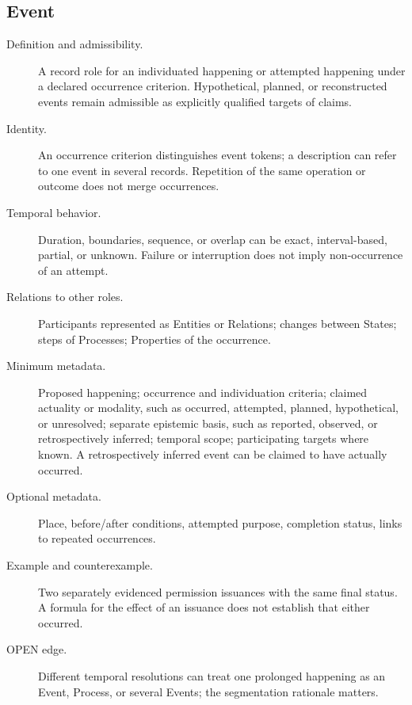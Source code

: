 \documentclass[11pt,a4paper]{article}
\begin{document}
\subsection{Event}
\begin{description}
\item[Definition and admissibility.] A record role for an individuated happening or attempted happening under a declared occurrence criterion. Hypothetical, planned, or reconstructed events remain admissible as explicitly qualified targets of claims.
\item[Identity.] An occurrence criterion distinguishes event tokens; a description can refer to one event in several records. Repetition of the same operation or outcome does not merge occurrences.
\item[Temporal behavior.] Duration, boundaries, sequence, or overlap can be exact, interval-based, partial, or unknown. Failure or interruption does not imply non-occurrence of an attempt.
\item[Relations to other roles.] Participants represented as Entities or Relations; changes between States; steps of Processes; Properties of the occurrence.
\item[Minimum metadata.] Proposed happening; occurrence and individuation criteria; claimed actuality or modality, such as occurred, attempted, planned, hypothetical, or unresolved; separate epistemic basis, such as reported, observed, or retrospectively inferred; temporal scope; participating targets where known. A retrospectively inferred event can be claimed to have actually occurred.
\item[Optional metadata.] Place, before/after conditions, attempted purpose, completion status, links to repeated occurrences.
\item[Example and counterexample.] Two separately evidenced permission issuances with the same final status. A formula for the effect of an issuance does not establish that either occurred.
\item[OPEN edge.] Different temporal resolutions can treat one prolonged happening as an Event, Process, or several Events; the segmentation rationale matters.
\end{description}
\end{document}
